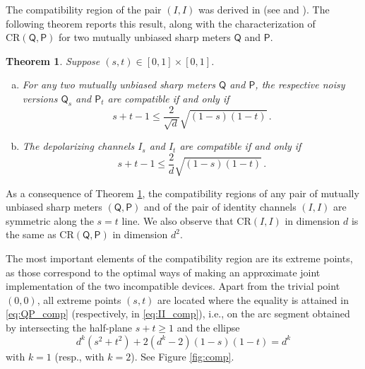 \documentclass[12pt,reqno]{amsart}
\newtheorem{theorem}{Theorem}
\theoremstyle{definition}
\newcommand{\Qo}{\mathsf{Q}}%
\newcommand{\Po}{\mathsf{P}}%
\newcommand{\CR}[1]{\textrm{CR} #1} %
\begin{document}
The compatibility region of the pair $(I,I)$ was derived in \cite{Hashagen17,Haapasalo19} (see \cite[Eq.~(24) and Fig.~B.1]{Hashagen17} and \cite[Eq.~(5.12) and Fig.~1]{Haapasalo19}). The following theorem reports this result, along with the characterization of $\CR{(\Qo,\Po)}$ for two mutually unbiased sharp meters $\Qo$ and $\Po$.

\begin{theorem}\label{thm:QP+II}
Suppose $(s,t)\in [0,1]\times [0,1]$.
\begin{enumerate}[(a)]
\item For any two mutually unbiased sharp meters $\Qo$ and $\Po$, the respective noisy versions $\Qo_s$ and $\Po_t$ are compatible if and only if
\begin{equation}\label{eq:QP_comp}
s+t-1\leq \frac{2}{\sqrt{d}}\sqrt{(1-s)(1-t)}\, .
\end{equation}
\item The depolarizing channels $I_s$ and $I_t$ are compatible if and only if
\begin{equation}\label{eq:II_comp}
s+t-1\leq \frac{2}{d}\sqrt{(1-s)(1-t)}\, .
\end{equation}
\end{enumerate}
\end{theorem}

As a consequence of Theorem \ref{thm:QP+II}, the compatibility regions of any pair of mutually unbiased sharp meters $(\Qo,\Po)$ and of the pair of identity channels $(I,I)$ are symmetric along the $s=t$ line. 
We also observe that $\CR{(I,I)}$ in dimension $d$ is the same as $\CR{(\Qo,\Po)}$ in dimension $d^2$.

The most important elements of the compatibility region are its extreme points, as those correspond to the optimal ways of making an approximate joint implementation of the two incompatible devices. Apart from the trivial point $(0,0)$, all extreme points $(s,t)$ are located where the equality is attained in \eqref{eq:QP_comp} (respectively, in \eqref{eq:II_comp}), i.e., on the arc segment obtained by intersecting the half-plane $s+t\geq 1$ and the ellipse
\begin{equation}\label{eq:poly}
d^k (s^2 + t^2) + 2(d^k -2)(1-s)(1-t) = d^k
\end{equation}
with $k=1$ (resp., with $k=2$). See Figure \ref{fig:comp}.
\end{document}
